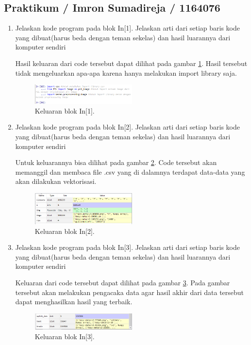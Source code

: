\subsection{Praktikum / Imron Sumadireja / 1164076}
\begin{enumerate}
\item Jelaskan kode program pada blok In[1]. Jelaskan arti dari setiap baris kode yang dibuat(harus beda dengan teman sekelas) dan hasil luarannya dari komputer sendiri \par

Hasil keluaran dari code tersebut dapat dilihat pada gambar \ref{math1}. Hasil tersebut tidak mengeluarkan apa-apa karena hanya melakukan import library saja.
		\begin{figure}[!htbp]
		\centerline{\includegraphics[width=0.5\textwidth]{figures/im/math1.png}}
		\caption{Keluaran blok In[1].}
		\label{math1}
		\end{figure}

\item Jelaskan kode program pada blok In[2]. Jelaskan arti dari setiap baris kode yang dibuat(harus beda dengan teman sekelas) dan hasil luarannya dari komputer sendiri \par

Untuk keluarannya bisa dilihat pada gambar \ref{math2}. Code tersebut akan memanggil dan membaca file .csv yang di dalamnya terdapat data-data yang akan dilakukan vektorisasi.
		\begin{figure}[!htbp]
		\centerline{\includegraphics[width=0.5\textwidth]{figures/im/math2.png}}
		\caption{Keluaran blok In[2].}
		\label{math2}
		\end{figure}

\item Jelaskan kode program pada blok In[3]. Jelaskan arti dari setiap baris kode yang dibuat(harus beda dengan teman sekelas) dan hasil luarannya dari komputer sendiri \par

Keluaran dari code tersebut dapat dilihat pada gambar \ref{math3}. Pada gambar tersebut akan melakukan pengacaka data agar hasil akhir dari data tersebut dapat menghasilkan hasil yang terbaik.
		\begin{figure}[!htbp]
		\centerline{\includegraphics[width=0.5\textwidth]{figures/im/math3.png}}
		\caption{Keluaran blok In[3].}
		\label{math3}
		\end{figure}


\end{enumerate}
